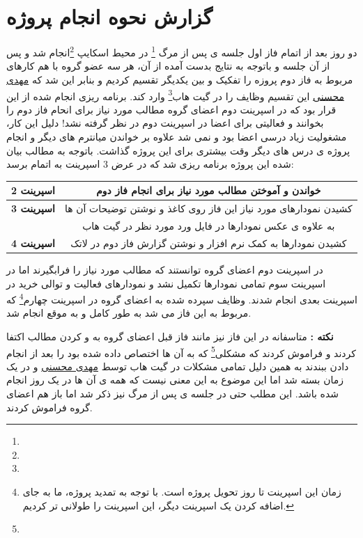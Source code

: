 \documentclass[12pt,a4paper]{article}
\begin{document}
\section{گزارش نحوه انجام پروژه} \label{section.report}
	دو روز بعد از اتمام فاز اول جلسه ی پس از مرگ \footnote{} در محیط اسکایپ \footnote{}انجام شد و پس از آن جلسه و باتوجه به نتایج بدست آمده از آن، هر سه عضو گروه با هم کارهای مربوط به فاز دوم پروزه را تفکیک و بین یکدیگر تقسیم کردیم و بنابر این شد که \underline{مهدی محسنی} این تقسیم وظایف را در گیت هاب\footnote{} وارد کند. برنامه ریزی انجام شده از این قرار بود که در اسپرینت دوم اعضای گروه مطالب مورد نیاز برای انحام فاز دوم را بخوانند و فعالیتی برای اعضا در اسپرینت دوم در نظر گرفته نشد! دلیل این کار، مشغولیت زیاد درسی اعضا بود و نمی شد علاوه بر خواندن میانترم های دیگر و انجام پروژه ی درس های دیگر وقت بیشتری برای این پروژه گذاشت. باتوجه به مطالب بیان شده این پروژه برنامه ریزی شد که در عرض 3 اسپرینت به اتمام برسد:
	\begin{center}
		\begin{tabular}{|c|c|} 
			\hline
			\textbf{اسپرینت 2 } & خواندن و آموختن مطالب مورد نیاز برای انجام فاز دوم\\
			\hline
			\hline
			\textbf{اسپرینت 3 } & کشیدن نمودارهای مورد نیاز این فاز روی کاغذ و  نوشتن توضیحات آن ها \\
						 & به علاوه ی عکس نمودارها در فایل ورد مورد نظر در گیت هاب \\
			\hline
			\hline
			\textbf{اسپرینت 4} & کشیدن نمودارها به کمک نرم افزار و نوشتن گزارش فاز دوم در لاتک\\
			\hline
		\end{tabular}
	\end{center}


در اسپرینت دوم اعضای گروه توانستند که مطالب مورد نیاز را فرابگیرند اما در اسپرینت سوم تمامی نمودارها تکمیل نشد و نمودارهای فعالیت و توالی خرید در اسپرینت بعدی انجام شدند. وظایف سپرده شده به اعضای گروه در اسپرینت چهارم\footnote{زمان این اسپرینت تا روز تحویل پروژه است. با توجه به تمدید پروژه، ما به جای اضافه کردن یک اسپرینت دیگر، این اسپرینت را طولانی تر کردیم.} که مربوط به این فاز می شد به طور کامل و به موقع انجام شد. 


\textbf{نکته :} متاسفانه در این فاز نیز مانند فاز قبل اعضای گروه به  و  کردن مطالب اکتفا کردند و فراموش کردند که مشکلی\footnote{} که به آن ها اختصاص داده شده بود را بعد از انجام دادن ببندند به همین دلیل تمامی مشکلات در گیت هاب توسط \underline{مهدی محسنی} و در یک زمان بسته شد اما این موضوع به این معنی نیست که همه ی آن ها در یک روز انجام شده باشد. این مطلب حتی در جلسه ی پس از مرگ نیز ذکر شد اما باز هم اعضای گروه فراموش کردند.
\end{document}
